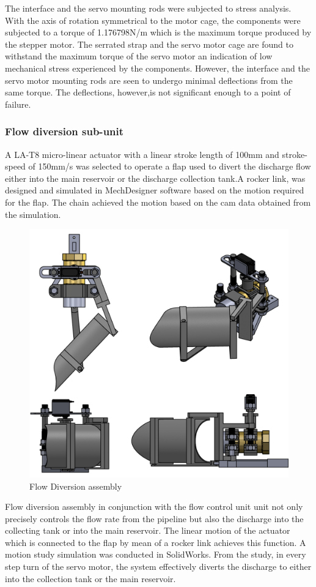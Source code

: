     The interface and the servo mounting rods were subjected to stress analysis. With the axis of rotation symmetrical to the motor cage, the components were subjected to a torque of 1.176798N/m which is the maximum torque produced by the stepper motor. The serrated strap and the servo motor cage are found to withstand the maximum torque of the servo motor an indication of low mechanical stress experienced by the components. However, the interface and the servo motor mounting rods are seen to undergo minimal deflections from the same torque. The deflections, however,is not significant enough to a point of failure. 
\subsubsection{Flow diversion sub-unit}
A LA-T8 micro-linear actuator with a linear stroke length of 100mm and stroke-speed of 150mm/s was selected to operate a flap used to divert the discharge flow either into the main reservoir or the discharge collection tank.A rocker link, was designed and simulated in MechDesigner software based on the motion required for the flap. The chain achieved the motion based on the cam data obtained from the simulation.
\begin{figure}[H]
         \centering
         \includegraphics{Figures/DischargeFlowControlAssembly.PNG}
         \caption{Flow Diversion assembly}
         \label{fig:flow_diversion_assembly}
     \end{figure}
\par
Flow diversion assembly in conjunction with the flow control unit unit not only precisely controls the flow rate from the pipeline but also the discharge into the collecting tank or into the main reservoir. The linear motion of the actuator which is connected to the flap by mean of a rocker link achieves this function. A motion study simulation was conducted in SolidWorks. From  the study, in every step turn of the servo motor, the system effectively diverts the discharge to either into the collection tank or the main reservoir. 
